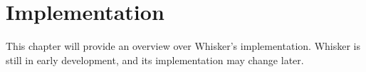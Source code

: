 







\chapter{Implementation}

This chapter will provide an overview over Whisker's implementation.
Whisker is still in early development, and its implementation may change later.

%
%

